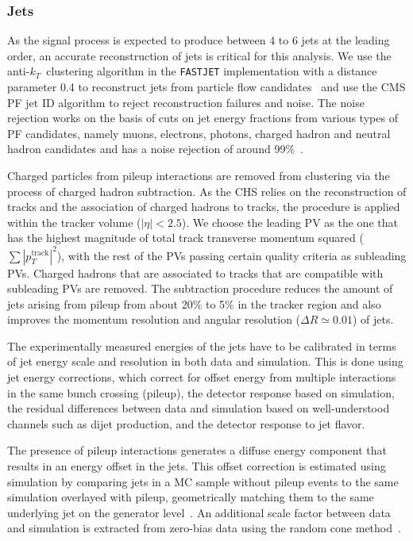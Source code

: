 \subsubsection{Jets}
\label{sec:object_id_jets}
As the signal process is expected to produce between 4 to 6 jets at the leading order, an accurate reconstruction of jets is critical for this analysis. We use the anti-$k_T$~clustering algorithm\cite{Cacciari:2008gp} in the \texttt{FASTJET} implementation\cite{Cacciari:2011ma} with a distance parameter 0.4 to reconstruct jets from particle flow candidates~\cite{CMS:2010xta,CMS:2009nxa,CMS:2010byl} and use the CMS PF jet ID algorithm to reject reconstruction failures and noise. The noise rejection works on the basis of cuts on jet energy fractions from various types of PF candidates, namely muons, electrons, photons, charged hadron and neutral hadron candidates and has a noise rejection of around 99\%~\cite{CMS:2017wyc}.

Charged particles from pileup interactions are removed from clustering via the process of charged hadron subtraction. As the CHS relies on the reconstruction of tracks and the association of charged hadrons to tracks, the procedure is applied within the tracker volume ($|\eta| < 2.5$). We choose the leading PV as the one that has the highest magnitude of total track transverse momentum squared ($\sum |p_T^{\mathrm{track}}|^2$), with the rest of the PVs passing certain quality criteria as subleading PVs. Charged hadrons that are associated to tracks that are compatible with subleading PVs are removed. The subtraction procedure reduces the amount of jets arising from pileup from about 20\% to 5\% in the tracker region and also improves the momentum resolution and angular resolution ($\Delta R \simeq 0.01$) of jets\cite{CMS:2014ata}.

The experimentally measured energies of the jets have to be calibrated in terms of jet energy scale and resolution in both data and simulation. This is done using jet energy corrections, which correct for offset energy from multiple interactions in the same bunch crossing (pileup), the detector response based on simulation, the residual differences between data and simulation based on well-understood channels such as dijet production, and the detector response to jet flavor. 

The presence of pileup interactions generates a diffuse energy component that results in an energy offset in the jets. This offset correction is estimated using simulation by comparing jets in a MC sample without pileup events to the same simulation overlayed with pileup, geometrically matching them to the same underlying jet on the generator level~\cite{cms_jec_2017}. An additional scale factor between data and simulation is extracted from zero-bias data using the random cone method~\cite{Chatrchyan:2011ds}.  

